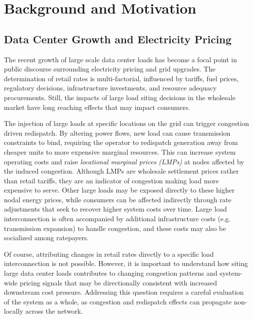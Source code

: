 \section{Background and Motivation}

\subsection{Data Center Growth and Electricity Pricing}
The recent growth of large scale data center loads has become a focal point in public discourse surrounding electricity pricing and grid upgrades. The determination of retail rates is multi-factorial, influenced by tariffs, fuel prices, regulatory decisions, infrastructure investments, and resource adequacy procurements. Still, the impacts of large load siting decisions in the wholesale market have long reaching effects that may impact consumers. 

The injection of large loads at specific locations on the grid can trigger congestion driven redispatch. By altering power flows, new load can cause transmission constraints to bind, requiring the operator to redispatch generation away from cheaper units to more expensive marginal resources. This can increase system operating costs and raise \emph{locational marginal prices (LMPs)} at nodes affected by the induced congestion. Although LMPs are wholesale settlement prices rather than retail tariffs, they are an indicator of congestion making load more expensive to serve. Other large loads may be exposed directly to these higher nodal energy prices, while consumers can be affected indirectly through rate adjustments that seek to recover higher system costs over time. Large load interconnection is often accompanied by additional infrastructure costs (e.g. transmission expansion) to handle congestion, and these costs may also be socialized among ratepayers. 

Of course, attributing changes in retail rates directly to a specific load interconnection is not possible. However, it is important to understand how siting large data center loads contributes to changing congestion patterns and system-wide pricing signals that may be directionally consistent with increased downstream cost pressure. Addressing this question requires a careful evaluation of the system as a whole, as congestion and redispatch effects can propagate non-locally across the network. 

